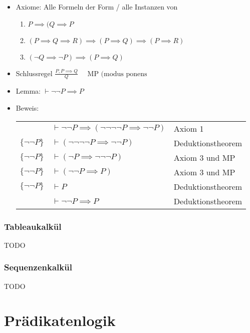 \documentclass{scrartcl}
\begin{document}
\begin{itemize}
	\item Axiome: Alle Formeln der Form / alle Instanzen von
	\begin{enumerate}
		\item $P \implies (Q \implies P$
		\item $(P \implies Q \implies R) \implies (P \implies Q) \implies (P \implies R)$
		\item $(\neg Q \implies \neg P) \implies (P \implies Q)$
	\end{enumerate}
	\item Schlussregel $\frac{P, P \implies Q}{Q} \quad \text{ MP (modus ponens}$
\end{itemize}

\begin{itemize}
	\item Lemma: $\vdash \neg \neg P \implies P$
	\item Beweis: \\
	\begin{tabular}{l l l}
	& $\vdash \neg \neg P \implies (\neg \neg \neg \neg P \implies \neg \neg P)$ & Axiom 1 \\
	$\{ \neg \neg P \}$ & $\vdash (\neg \neg \neg \neg P \implies \neg \neg P)$ & Deduktionstheorem \\
	$\{ \neg \neg P \}$ & $\vdash (\neg P \implies \neg \neg  \neg P)$ & Axiom 3 und MP \\
	$\{ \neg \neg P \}$ & $\vdash (\neg \neg P \implies P)$ & Axiom 3 und MP \\
	$\{ \neg \neg P \}$ & $\vdash P$ & Deduktionstheorem \\
	& $\vdash \neg \neg P \implies P$ & Deduktionstheorem \\ 
	\end{tabular} 
\end{itemize}

\subsubsection{Tableaukalkül}

TODO

\subsubsection{Sequenzenkalkül}

TODO

\pagebreak
\section{Prädikatenlogik}
\end{document}
